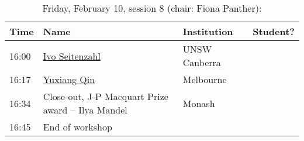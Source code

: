 \documentclass[amsmath,onecolumn]{revtex4-1}
\begin{document}
\begin{table}[!htbp]
	\centering
	\caption{Friday, February 10, session 8 (chair: Fiona Panther):}
\begin{tabular}{| l | l | l | c |}
	\hline
	Time & Name  & Institution & Student? \\ 		
	\hline
	16:00 &\href{https://forms.gle/ZM8HoYqw1VRShzLNA}{Ivo Seitenzahl} & UNSW Canberra &  \\
	16:17 & \href{https://forms.gle/ZM8HoYqw1VRShzLNA}{Yuxiang Qin} & Melbourne &  \\
	16:34 & Close-out, J-P Macquart Prize award -- Ilya Mandel & Monash & \\
	16:45 & End of workshop & & \\
	\hline
\end{tabular}
\end{table}
\end{document}
